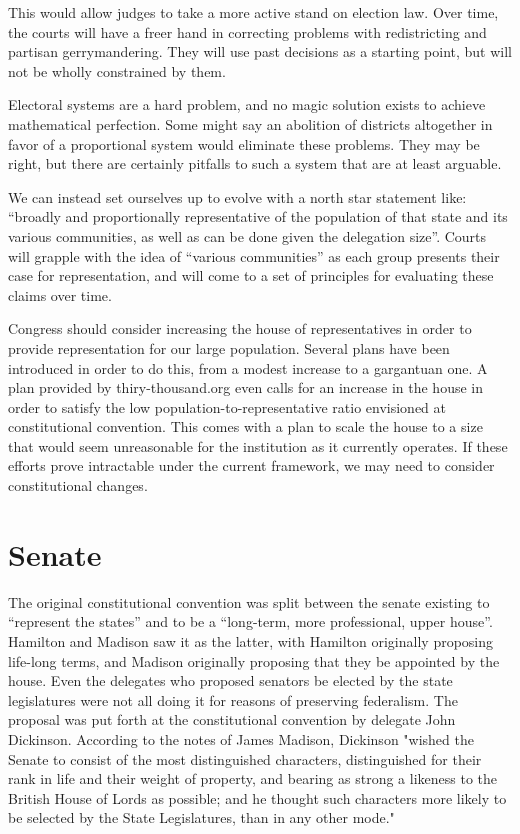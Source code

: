 \documentclass{article}
\begin{document}
This would allow judges to take a more active stand on election law. Over time, the courts will have a freer hand in correcting problems with redistricting and partisan gerrymandering. They will use past decisions as a starting point, but will not be wholly constrained by them.

Electoral systems are a hard problem, and no magic solution exists to achieve mathematical perfection. Some might say an abolition of districts altogether in favor of a proportional system would eliminate these problems. They may be right, but there are certainly pitfalls to such a system that are at least arguable.

We can instead set ourselves up to evolve with a north star statement like: “broadly and proportionally representative of the population of that state and its various communities, as well as can be done given the delegation size”. Courts will grapple with the idea of “various communities” as each group presents their case for representation, and will come to a set of principles for evaluating these claims over time.

Congress should consider increasing the house of representatives in order to provide representation for our large population. Several plans have been introduced in order to do this, from a modest increase to a gargantuan one\cite{Allen}. A plan provided by thiry-thousand.org even calls for an increase in the house in order to satisfy the low population-to-representative ratio envisioned at constitutional convention\cite{30000}. This comes with a plan to scale the house to a size that would seem unreasonable for the institution as it currently operates. If these efforts prove intractable under the current framework, we may need to consider constitutional changes.

\section{Senate}

The original constitutional convention was split between the senate existing to “represent the states” and to be a “long-term, more professional, upper house”. Hamilton and Madison saw it as the latter, with Hamilton originally proposing life-long terms, and Madison originally proposing that they be appointed by the house. Even the delegates who proposed senators be elected by the state legislatures were not all doing it for reasons of preserving federalism. The proposal was put forth at the constitutional convention by delegate John Dickinson. According to the notes of James Madison, Dickinson "wished the Senate to consist of the most distinguished characters, distinguished for their rank in life and their weight of property, and bearing as strong a likeness to the British House of Lords as possible; and he thought such characters more likely to be selected by the State Legislatures, than in any other mode."
\end{document}
